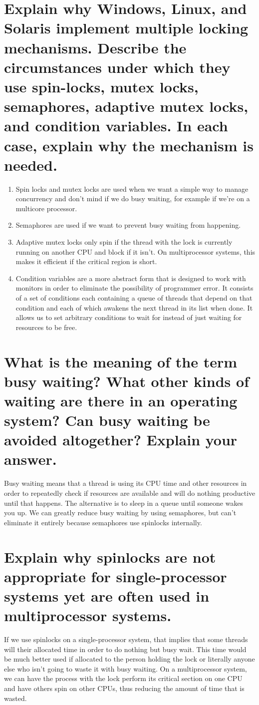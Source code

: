 \documentclass{book}%
\begin{document}
\section{Explain why Windows, Linux, and Solaris implement multiple locking
mechanisms. Describe the circumstances under which they use spin-locks, mutex
locks, semaphores, adaptive mutex locks, and condition variables. In each case,
explain why the mechanism is needed.}
\begin{enumerate}
\item Spin locks and mutex locks are used when we want a simple way to manage
concurrency and don't mind if we do busy waiting, for example if we're on a
multicore processor.
\item Semaphores are used if we want to prevent busy waiting from happening.
\item Adaptive mutex locks only spin if the thread with the lock is currently
running on another CPU and block if it isn't. On multiprocessor systems, this
makes it efficient if the critical region is short.
\item Condition variables are a more abstract form that is designed to work with
monitors in order to eliminate the possibility of programmer error. It consists
of a set of conditions each containing a queue of threads that depend on that
condition and each of which awakens the next thread in its list when done. It
allows us to set arbitrary conditions to wait for instead of just waiting for
resources to be free.
\end{enumerate}
\section{What is the meaning of the term busy waiting? What other kinds of
waiting are there in an operating system? Can busy waiting be avoided 
altogether? Explain your answer.}
Busy waiting means that a thread is using its CPU time and other resources in
order to repeatedly check if resources are available and will do nothing
productive until that happens. The alternative is to sleep in a queue until
someone wakes you up. We can greatly reduce busy waiting by using semaphores,
but can't eliminate it entirely because semaphores use spinlocks internally.
\section{Explain why spinlocks are not appropriate for single-processor systems
yet are often used in multiprocessor systems.}
If we use spinlocks on a single-processor system, that implies that some threads
will their allocated time in order to do nothing but busy wait. This time would
be much better used if allocated to the person holding the lock or literally
anyone else who isn't going to waste it with busy waiting. On a multiprocessor
system, we can have the process with the lock perform its critical section on
one CPU and have others spin on other CPUs, thus reducing the amount of time
that is wasted.
\end{document}
